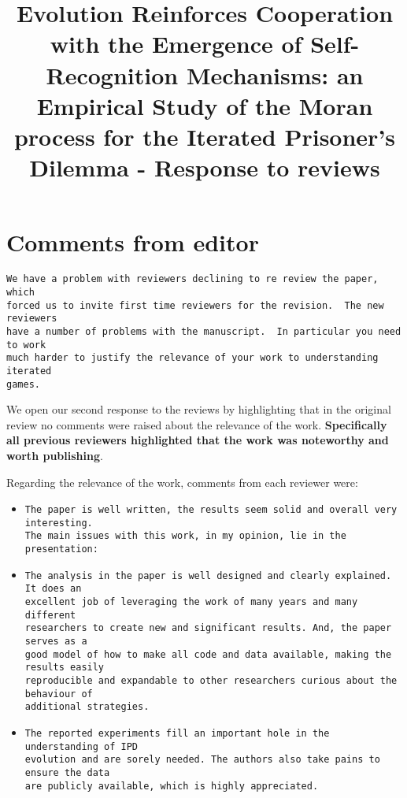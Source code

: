 \documentclass[a4]{article}
\title{Evolution Reinforces Cooperation with the Emergence of Self-Recognition
       Mechanisms: an Empirical Study of the Moran process for the Iterated
       Prisoner's Dilemma - Response to reviews}
\begin{document}
\maketitle

\section{Comments from editor}

\begin{verbatim}
We have a problem with reviewers declining to re review the paper, which
forced us to invite first time reviewers for the revision.  The new reviewers
have a number of problems with the manuscript.  In particular you need to work
much harder to justify the relevance of your work to understanding iterated
games.
\end{verbatim}

We open our second response to the reviews by highlighting that in the original
review no comments were raised about the relevance of the work.
\textbf{Specifically all previous reviewers highlighted that the work was
noteworthy and worth publishing}.

Regarding the relevance of the work, comments from each reviewer were:

\begin{itemize}
    \item
\begin{verbatim}
The paper is well written, the results seem solid and overall very interesting.
The main issues with this work, in my opinion, lie in the presentation:
\end{verbatim}
    \item

\begin{verbatim}
The analysis in the paper is well designed and clearly explained. It does an
excellent job of leveraging the work of many years and many different
researchers to create new and significant results. And, the paper serves as a
good model of how to make all code and data available, making the results easily
reproducible and expandable to other researchers curious about the behaviour of
additional strategies.
\end{verbatim}
    \item

\begin{verbatim}
The reported experiments fill an important hole in the understanding of IPD
evolution and are sorely needed. The authors also take pains to ensure the data
are publicly available, which is highly appreciated.
\end{verbatim}
\end{itemize}
\end{document}
